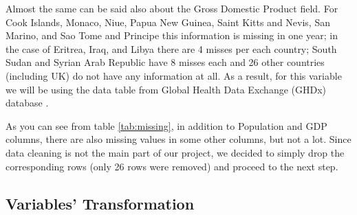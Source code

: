 Almost the same can be said also about the Gross Domestic Product field. For Cook Islands, Monaco, Niue, Papua New Guinea, Saint Kitts and Nevis, San Marino, and Sao Tome and Principe this information is missing in one year; in the case of Eritrea, Iraq, and Libya there are 4 misses per each country; South Sudan and Syrian Arab Republic have 8 misses each and 26 other countries (including UK) do not have any information at all. As a result, for this variable we will be using the data table from Global Health Data Exchange (GHDx) database \cite{GHDx}.

As you can see from table \ref{tab:missing}, in addition to Population and GDP columns, there are also missing values in some other columns, but not a lot. Since data cleaning is not the main part of our project, we decided to simply drop the corresponding rows (only 26 rows were removed) and proceed to the next step.


\subsection{Variables' Transformation}
\label{sec:vari-transf}






